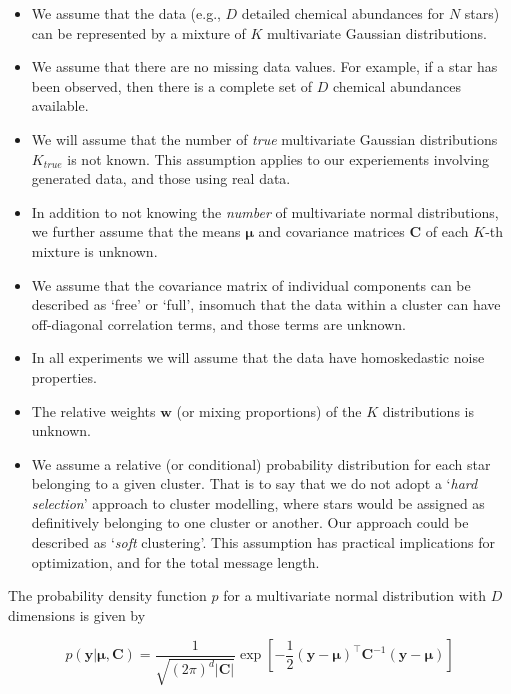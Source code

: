 \documentclass{aastex61}
\newcommand{\vect}[1]{\boldsymbol{\mathbf{#1}}}
\def\veccov{\vect{C}}
\def\vecmean{\vect{\mu}}
\def\weight{w}
\def\weights{\vect{\weight}}
\def\datum{y}
\def\data{\vect{\datum}}
\begin{document}
\begin{itemize}
  \item We assume that the data (e.g., $D$ detailed chemical abundances for
        $N$ stars) can be represented by a mixture of $K$ multivariate 
        Gaussian distributions.
  \item We assume that there are no missing data values. 
        For example, if a star has been observed, then there is a complete set
        of $D$ chemical abundances available.
  \item We will assume that the number of \emph{true} multivariate Gaussian
        distributions $K_{true}$ is not known. 
        This assumption applies to our experiements involving generated data, 
        and those using real data.
  \item In addition to not knowing the \emph{number} of multivariate normal
        distributions, we further assume that the means $\vecmean$ and 
        covariance matrices $\veccov$ of each $K$-th mixture is unknown.
  \item We assume that the covariance matrix of individual components can be
        described as `free' or `full', insomuch that the data within a cluster
        can have off-diagonal correlation terms, and those terms are unknown.
  \item In all experiments we will assume that the data have homoskedastic 
        noise properties.
  \item The relative weights $\weights$ (or mixing proportions) of the $K$ 
        distributions is unknown. 
  \item We assume a relative (or conditional) probability distribution for 
        each star belonging to a given cluster. That is to say that we do not 
        adopt a `\emph{hard selection}' approach to cluster modelling, where 
        stars would be assigned as definitively belonging to one cluster or 
        another. 
        Our approach could be described as `\emph{soft} clustering'.
        This assumption has practical implications for optimization, and for
        the total message length.
\end{itemize}


\noindent{}The probability density function $p$ for a multivariate normal 
distribution with $D$ dimensions is given by

\begin{equation}
  p(\data|\vecmean,\veccov) 
      = \frac{1}{\sqrt{(2\pi)^d|\veccov|}}
        \exp{\left[-\frac{1}{2}(\data - \vecmean)^\intercal\veccov^{-1}(\data - \vecmean)\right]}
\end{equation}
\end{document}

